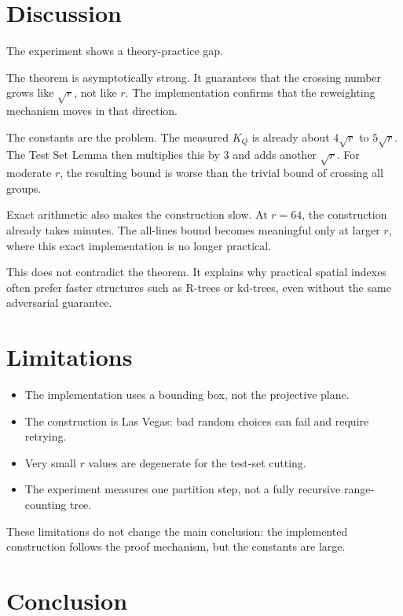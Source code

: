 \documentclass[11pt,a4paper]{article}
\begin{document}
\section{Discussion}
\label{sec:discussion}

The experiment shows a theory-practice gap.

The theorem is asymptotically strong. It guarantees that the crossing
number grows like $\sqrt r$, not like $r$. The implementation confirms
that the reweighting mechanism moves in that direction.

The constants are the problem. The measured $K_Q$ is already about
$4\sqrt r$ to $5\sqrt r$. The Test Set Lemma then multiplies this by
3 and adds another $\sqrt r$. For moderate $r$, the resulting bound is
worse than the trivial bound of crossing all groups.

Exact arithmetic also makes the construction slow. At $r=64$, the
construction already takes minutes. The all-lines bound becomes
meaningful only at larger $r$, where this exact implementation is no
longer practical.

This does not contradict the theorem. It explains why practical
spatial indexes often prefer faster structures such as R-trees or
kd-trees, even without the same adversarial guarantee.


\section{Limitations}
\label{sec:limitations}

\begin{itemize}[nosep,leftmargin=*]
  \item The implementation uses a bounding box, not the projective
        plane.
  \item The construction is Las Vegas: bad random choices can fail and
        require retrying.
  \item Very small $r$ values are degenerate for the test-set cutting.
  \item The experiment measures one partition step, not a fully
        recursive range-counting tree.
\end{itemize}

These limitations do not change the main conclusion: the implemented
construction follows the proof mechanism, but the constants are large.


\section{Conclusion}
\label{sec:conclusion}
\end{document}
